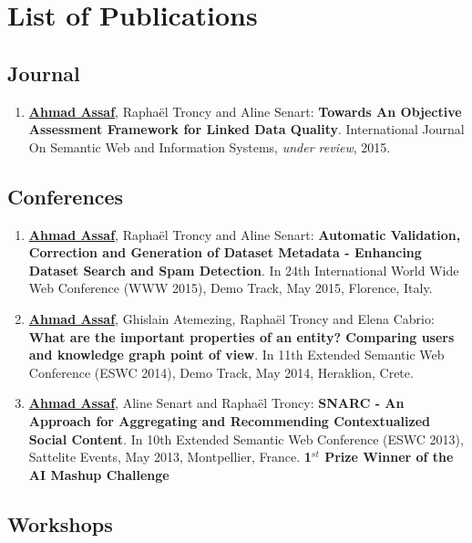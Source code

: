 \chapter*{List of Publications}

\section*{Journal}\label{sec:journals}

\begin{enumerate}
 \item \underline{\textbf{Ahmad Assaf}}, {R}apha{\"e}l {T}roncy and {A}line {S}enart: \textbf{Towards An Objective Assessment Framework for Linked Data Quality}. International Journal On Semantic Web and Information Systems, \emph{under review}, 2015.
\end{enumerate}

\section*{Conferences}\label{sec:conferences}

\begin{enumerate}
\item \underline{\textbf{Ahmad Assaf}}, {R}apha{\"e}l {T}roncy and {A}line {S}enart: \textbf{{A}utomatic Validation, Correction and Generation of Dataset Metadata - {E}nhancing Dataset Search and Spam Detection}. In 24th {I}nternational {W}orld {W}ide {W}eb {C}onference (WWW 2015), Demo Track, May 2015, {F}lorence, {I}taly.
\item \underline{\textbf{Ahmad Assaf}}, {G}hislain {A}temezing, {R}apha{\"e}l {T}roncy and {E}lena {C}abrio: \textbf{{W}hat are the important properties of an entity? {C}omparing users and knowledge graph point of view}. In 11th {E}xtended {S}emantic {W}eb {C}onference (ESWC 2014), Demo Track, May 2014, {H}eraklion, {C}rete.
\item \underline{\textbf{Ahmad Assaf}}, {A}line {S}enart and {R}apha{\"e}l {T}roncy: \textbf{{SNARC} - An Approach for Aggregating and Recommending Contextualized Social Content}. In 10th {E}xtended {S}emantic {W}eb {C}onference (ESWC 2013), Sattelite Events, May 2013, {M}ontpellier, {F}rance. \textbf{1$^{st}$ Prize Winner of the AI Mashup Challenge}
\end{enumerate}

\section*{Workshops}\label{sec:workshops}

